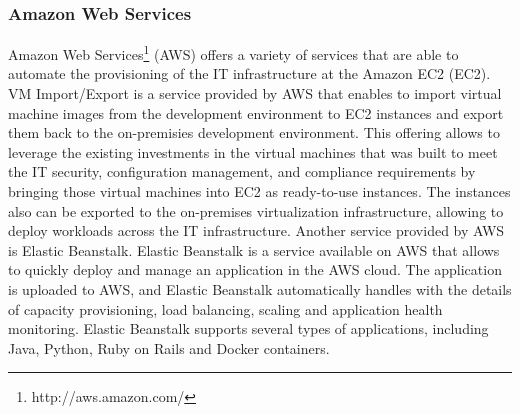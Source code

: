 \subsubsection{Amazon Web Services}
\label{subs:aws}
Amazon Web Services\footnote{http://aws.amazon.com/} (AWS) offers a variety of services that are able
to automate the provisioning of the IT infrastructure at the Amazon EC2 (EC2). VM Import/Export is a
service provided by AWS that enables to import virtual machine images from the development environment
to EC2 instances and export them back to the on-premisies development environment. This offering allows
to leverage the existing investments in the virtual machines that was built to meet the IT security,
configuration management, and compliance requirements by bringing those virtual machines into EC2 as
ready-to-use instances. The instances also can be exported to the on-premises virtualization infrastructure,
allowing to deploy workloads across the IT infrastructure. Another service provided by AWS is Elastic Beanstalk.
Elastic Beanstalk is a service available on AWS that allows to quickly deploy and manage an application in
the AWS cloud. The application is uploaded to AWS, and Elastic Beanstalk automatically handles with the
details of capacity provisioning, load balancing, scaling and application health monitoring. Elastic Beanstalk
supports several types of applications, including Java, Python, Ruby on Rails and Docker containers.

